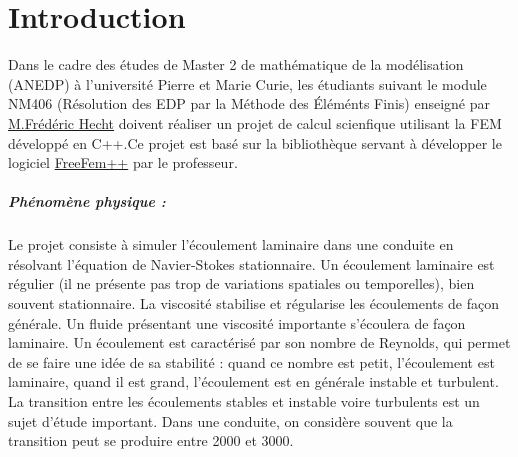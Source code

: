 \documentclass{book}
\begin{document}
\chapter*{Introduction}
Dans le cadre des études de Master 2 de mathématique de la modélisation (ANEDP) à l'université Pierre et Marie Curie, les étudiants suivant le module NM406 (Résolution des EDP par la Méthode des Éléménts Finis) enseigné par \href{http://www.ann.jussieu.fr/~hecht/}{M.Frédéric Hecht} doivent réaliser un projet de calcul scienfique utilisant la FEM développé en C++.Ce projet est basé sur la bibliothèque servant à développer le logiciel \href{http://www.freefem.org/ff++/}{FreeFem++} par le professeur.  

\paragraph{Phénomène physique : }Le projet consiste à simuler l'écoulement laminaire dans une conduite en résolvant l'équation de Navier-Stokes stationnaire. Un écoulement laminaire est régulier (il ne présente pas trop de variations spatiales ou temporelles), bien souvent stationnaire.  La viscosité stabilise et régularise les écoulements de façon générale. Un fluide présentant une viscosité importante s'écoulera de façon laminaire. Un écoulement est caractérisé par son nombre de Reynolds, qui permet de se faire une idée de sa stabilité : quand ce nombre est petit, l'écoulement est laminaire, quand il est grand, l'écoulement est en générale instable et turbulent. La transition entre les écoulements stables et instable voire turbulents est un sujet d'étude important. Dans une conduite, on considère souvent que la transition peut se produire entre 2000 et 3000.
\end{document}
